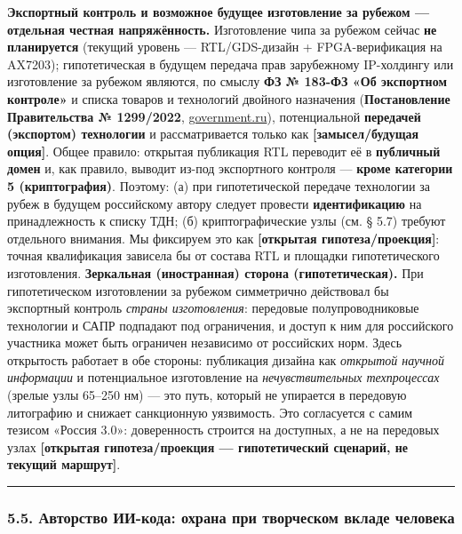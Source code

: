 \documentclass[
  russian,
]{article}
\begin{document}
\textbf{Экспортный контроль и возможное будущее изготовление за рубежом ---
отдельная честная напряжённость.} Изготовление чипа за рубежом сейчас
\textbf{не планируется} (текущий уровень --- RTL/GDS-дизайн + FPGA-верификация
на AX7203); гипотетическая в будущем передача прав зарубежному IP-холдингу или
изготовление за рубежом являются, по смыслу
\textbf{ФЗ № 183-ФЗ «Об экспортном контроле»} и списка товаров и
технологий двойного назначения (\textbf{Постановление Правительства №
1299/2022},
\href{http://government.ru/docs/all/152564/}{government.ru}),
потенциальной \textbf{передачей (экспортом) технологии} и рассматривается
только как \textbf{{[}замысел/будущая опция{]}}. Общее правило: открытая
публикация RTL переводит её в \textbf{публичный домен} и, как правило,
выводит из-под экспортного контроля --- \textbf{кроме категории 5
(криптография)}. Поэтому: (а) при гипотетической передаче технологии за рубеж
в будущем российскому автору следует провести \textbf{идентификацию} на
принадлежность к списку ТДН; (б) криптографические узлы (см. § 5.7)
требуют отдельного внимания. Мы фиксируем это как \textbf{{[}открытая
гипотеза/проекция{]}}: точная квалификация зависела бы от состава RTL и
площадки гипотетического изготовления. \textbf{Зеркальная (иностранная) сторона
(гипотетическая).} При гипотетическом изготовлении за рубежом симметрично
действовал бы экспортный контроль \emph{страны изготовления}:
передовые полупроводниковые технологии и
САПР подпадают под ограничения, и доступ к ним для российского участника
может быть ограничен независимо от российских норм. Здесь открытость
работает в обе стороны: публикация дизайна как \emph{открытой научной
информации} и потенциальное изготовление на \emph{нечувствительных техпроцессах}
(зрелые узлы 65--250 нм) --- это путь, который не упирается в
передовую литографию и снижает санкционную уязвимость. Это согласуется с
самим тезисом «Россия 3.0»: доверенность строится на доступных, а не на
передовых узлах \textbf{{[}открытая гипотеза/проекция --- гипотетический
сценарий, не текущий маршрут{]}}.

\begin{center}\rule{0.5\linewidth}{0.5pt}\end{center}

\subsubsection{5.5. Авторство ИИ-кода: охрана при творческом вкладе
человека}\label{ux430ux432ux442ux43eux440ux441ux442ux432ux43e-ux438ux438-ux43aux43eux434ux430-ux43eux445ux440ux430ux43dux430-ux43fux440ux438-ux442ux432ux43eux440ux447ux435ux441ux43aux43eux43c-ux432ux43aux43bux430ux434ux435-ux447ux435ux43bux43eux432ux435ux43aux430}
\end{document}
